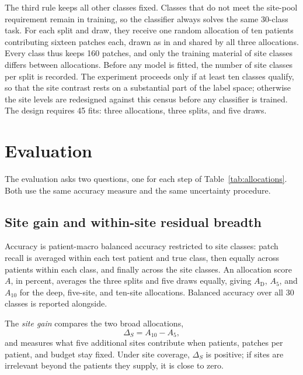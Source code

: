 \documentclass[11pt]{article}
\begin{document}
The third rule keeps all other classes fixed. Classes that do not meet the site-pool requirement remain in training, so the classifier always solves the same 30-class task. For each split and draw, they receive one random allocation of ten patients contributing sixteen patches each, drawn as in \citet{queisler2026effectiveSupport} and shared by all three allocations. Every class thus keeps 160 patches, and only the training material of site classes differs between allocations. Before any model is fitted, the number of site classes per split is recorded. The experiment proceeds only if at least ten classes qualify, so that the site contrast rests on a substantial part of the label space; otherwise the site levels are redesigned against this census before any classifier is trained. The design requires 45 fits: three allocations, three splits, and five draws.

\section{Evaluation}
\label{sec:evaluation}
The evaluation asks two questions, one for each step of Table~\ref{tab:allocations}. Both use the same accuracy measure and the same uncertainty procedure.

\subsection{Site gain and within-site residual breadth}
\label{sec:contrasts}
Accuracy is patient-macro balanced accuracy restricted to site classes: patch recall is averaged within each test patient and true class, then equally across patients within each class, and finally across the site classes. An allocation score $A$, in percent, averages the three splits and five draws equally, giving $A_{\mathrm D}$, $A_5$, and $A_{10}$ for the deep, five-site, and ten-site allocations. Balanced accuracy over all 30 classes is reported alongside.

The \emph{site gain} compares the two broad allocations,
\begin{equation}
 \Delta_S=A_{10}-A_{5},
 \label{eq:site-gain}
\end{equation}
\noindent and measures what five additional sites contribute when patients, patches per patient, and budget stay fixed. Under site coverage, $\Delta_S$ is positive; if sites are irrelevant beyond the patients they supply, it is close to zero.
\end{document}
